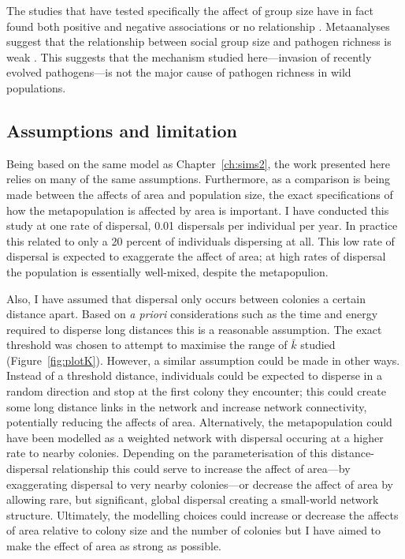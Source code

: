 The studies that have tested specifically the affect of group size have in fact found both positive \cite{vitone2004body} and negative associations \cite{gay2014parasite} or no relationship \cite{ezenwa2006host}.
Metaanalyses suggest that the relationship between social group size and pathogen richness is weak \cite{rifkin2012animals}.
This suggests that the mechanism studied here---invasion of recently evolved pathogens---is not the major cause of pathogen richness in wild populations.



\subsection{Assumptions and limitation}

Being based on the same model as Chapter~\ref{ch:sims2}, the work presented here relies on many of the same assumptions.
Furthermore, as a comparison is being made between the affects of area and population size, the exact specifications of how the metapopulation is affected by area is important.
I have conducted this study at one rate of dispersal, 0.01 dispersals per individual per year.
In practice this related to only a 20 percent of individuals dispersing at all.
This low rate of dispersal is expected to exaggerate the affect of area; at high rates of dispersal the population is essentially well-mixed, despite the metapopulion.

Also, I have assumed that dispersal only occurs between colonies a certain distance apart.
Based on \emph{a priori} considerations such as the time and energy required to disperse long distances this is a reasonable assumption.
The exact threshold was chosen to attempt to maximise the range of $\bar{k}$ studied (Figure~\ref{fig:plotK}).
However, a similar assumption could be made in other ways.
Instead of a threshold distance, individuals could be expected to disperse in a random direction and stop at the first colony they encounter; this could create some long distance links in the network and increase network connectivity, potentially reducing the affects of area.
Alternatively, the metapopulation could have been modelled as a weighted network with dispersal occuring at a higher rate to nearby colonies.
Depending on the parameterisation of this distance-dispersal relationship this could serve to increase the affect of area---by exaggerating dispersal to very nearby colonies---or decrease the affect of area by allowing rare, but significant, global dispersal creating a small-world network structure.
Ultimately, the modelling choices could increase or decrease the affects of area relative to colony size and the number of colonies but I have aimed to make the effect of area as strong as possible.




